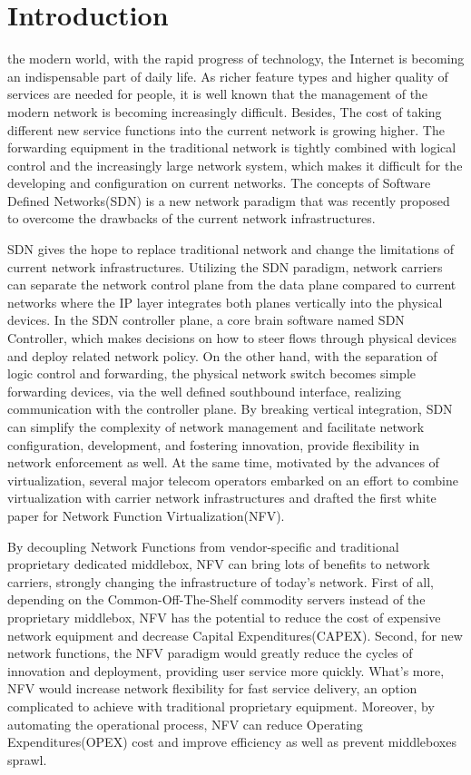 \documentclass{ieeeaccess}
\begin{document}
\section{Introduction}
\label{sec:introduction}
 the modern world, with the rapid progress of technology, the Internet is becoming an indispensable part of daily life. As richer feature types and higher quality of services are needed for people, it is well known that the management of the modern network is becoming increasingly difficult. Besides, The cost of taking different new service functions into the current network is growing higher. The forwarding equipment in the traditional network is tightly combined with logical control and the increasingly large network system, which makes it difficult for the developing and configuration on current networks. The concepts of Software Defined Networks(SDN)\cite{b1} is a new network paradigm that was recently proposed to overcome the drawbacks of the current network infrastructures.

SDN gives the hope to replace traditional network and change the limitations of current network infrastructures. Utilizing the SDN paradigm, network carriers can separate the network control plane from the data plane compared to current networks where the IP layer integrates both planes vertically into the physical devices. In the SDN controller plane, a core brain software named SDN Controller, which makes decisions on how to steer flows through physical devices and deploy related network policy. On the other hand, with the separation of logic control and forwarding, the physical network switch becomes simple forwarding devices, via the well defined southbound interface, realizing communication with the controller plane\cite{b3}. By breaking vertical integration, SDN can simplify the complexity of network management and facilitate network configuration, development, and fostering innovation, provide flexibility in network enforcement as well\cite{b3}. At the same time, motivated by the advances of virtualization, several major telecom operators embarked on an effort to combine virtualization with carrier network infrastructures and drafted the first white paper for Network Function Virtualization(NFV)\cite{b2}.

By decoupling Network Functions from vendor-specific and traditional proprietary dedicated middlebox, NFV can bring lots of benefits to network carriers, strongly changing the infrastructure of today’s network. First of all, depending on the Common-Off-The-Shelf commodity servers instead of the proprietary middlebox, NFV has the potential to reduce the cost of expensive network equipment and decrease Capital Expenditures(CAPEX)\cite{b4}. Second, for new network functions, the NFV paradigm would greatly reduce the cycles of innovation and deployment, providing user service more quickly. What’s more, NFV would increase network flexibility for fast service delivery, an option complicated to achieve with traditional proprietary equipment\cite{b5}. Moreover, by automating the operational process, NFV can reduce Operating Expenditures(OPEX)\cite{b6} cost and improve efficiency as well as prevent middleboxes sprawl.
\end{document}
